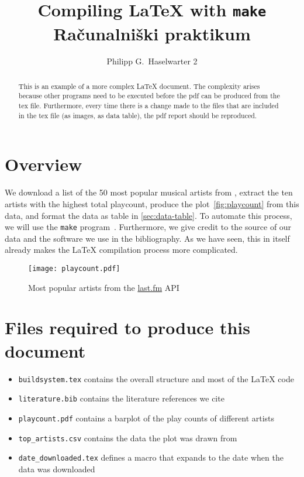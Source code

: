 \documentclass[a4paper,11pt]{article}
\begin{document}
\author{Philipp G.~Haselwarter 2}
\title{Compiling \LaTeX{} with \texttt{make} \\[.2\baselineskip]
  \large Ra\v{c}unalni\v{s}ki praktikum}

\maketitle{}

\begin{abstract}
This is an example of a more complex \LaTeX{} document. The complexity arises because other programs need to be executed before the pdf can be produced from the tex file. Furthermore, every time there is a change made to the files that are included in the tex file (as images, as data table), the pdf report should be reproduced.
\end{abstract}

\section*{Overview}

We download a list of the 50 most popular musical artists from \cite{lastfm}, extract the ten artists with the highest total playcount, produce the plot~\autoref{fig:playcount} from this data, and format the data as table in \autoref{sec:data-table}. To automate this process, we will use the \texttt{make} program~\cite{gnumake}. Furthermore, we give credit to the source of our data and the software we use in the bibliography. As we have seen, this in itself already makes the \LaTeX{} compilation process more complicated.

\begin{figure}[h]
  \centering
  \caption{Most popular artists from the \href{https://www.last.fm}{last.fm} API~\cite{lastfm:API} }
  \texttt{[image: playcount.pdf]}
  \label{fig:chart}
\end{figure}


\tableofcontents{}

\section{Files required to produce this document}

\begin{itemize}
\item \texttt{buildsystem.tex} contains the overall structure and most of the \LaTeX{} code
\item \texttt{literature.bib} contains the literature references we cite
\item \texttt{playcount.pdf} contains a barplot of the play counts of different artists
\item \texttt{top\_artists.csv} contains the data the plot was drawn from
\item \texttt{date\_downloaded.tex} defines a macro that expands to the date when the data was downloaded
\end{itemize}
\end{document}
